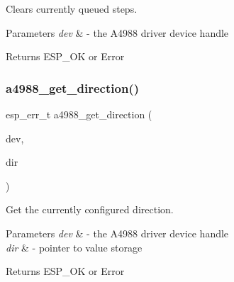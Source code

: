 Clears currently queued steps. 


\begin{DoxyParams}{Parameters}
{\em dev} & -\/ the A4988 driver device handle \\
\hline
\end{DoxyParams}
\begin{DoxyReturn}{Returns}
E\+S\+P\+\_\+\+OK or Error 
\end{DoxyReturn}
\mbox{\label{group__A4988__Driver__functions_ga23b84536dd1d56a74440425469f29875}} 
\subsubsection{\texorpdfstring{a4988\+\_\+get\+\_\+direction()}{a4988\_get\_direction()}}
{\footnotesize\ttfamily esp\+\_\+err\+\_\+t a4988\+\_\+get\+\_\+direction (\begin{DoxyParamCaption}\item[{\hyperlink{group__A4988__definitions_ga16590a9dd79ad8fcf4c317be2659b6c5}{A4988\+\_\+\+D\+EV}}]{dev,  }\item[{bool $\ast$}]{dir }\end{DoxyParamCaption})}



Get the currently configured direction. 


\begin{DoxyParams}{Parameters}
{\em dev} & -\/ the A4988 driver device handle \\
\hline
{\em dir} & -\/ pointer to value storage \\
\hline
\end{DoxyParams}
\begin{DoxyReturn}{Returns}
E\+S\+P\+\_\+\+OK or Error 
\end{DoxyReturn}
\mbox{\label{group__A4988__Driver__functions_ga06cdb3eee313296b14112378b6fede82}} 
